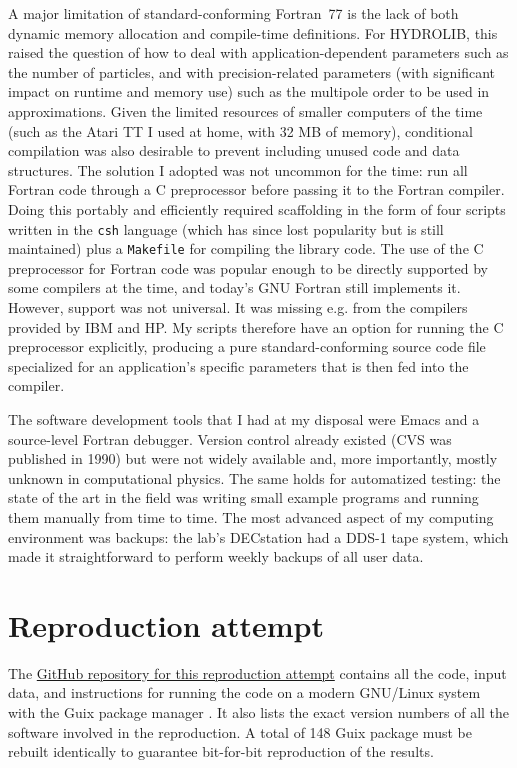 A major limitation of standard-conforming Fortran~77 is the lack of both dynamic memory allocation and compile-time definitions. For HYDROLIB, this raised the question of how to deal with application-dependent parameters such as the number of particles, and with precision-related parameters (with significant impact on runtime and memory use) such as the multipole order to be used in approximations. Given the limited resources of smaller computers of the time (such as the Atari TT I used at home, with 32 MB of memory), conditional compilation was also desirable to prevent including unused code and data structures. The solution I adopted was not uncommon for the time: run all Fortran code through a C preprocessor before passing it to the Fortran compiler. Doing this portably and efficiently required scaffolding in the form of four scripts written in the \texttt{csh} language (which has since lost popularity but is still maintained) plus a \texttt{Makefile} for compiling the library code. The use of the C preprocessor for Fortran code was popular enough to be directly supported by some compilers at the time, and today's GNU Fortran still implements it. However, support was not universal. It was missing e.g. from the compilers provided by IBM and HP. My scripts therefore have an option for running the C preprocessor explicitly, producing a pure standard-conforming source code file specialized for an application's specific parameters that is then fed into the compiler.

The software development tools that I had at my disposal were Emacs and a source-level Fortran debugger. Version control already existed (CVS was published in 1990) but were not widely available and, more importantly, mostly unknown in computational physics. The same holds for automatized testing: the state of the art in the field was writing small example programs and running them manually from time to time. The most advanced aspect of my computing environment was backups: the lab's DECstation had a DDS-1 tape system, which made it straightforward to perform weekly backups of all user data.

\section*{Reproduction attempt}

The \href{https://github.com/khinsen/rescience-ten-year-challenge-paper-4}{GitHub repository for this reproduction attempt} contains all the code, input data, and instructions for running the code on a modern GNU/Linux system with the Guix package manager \cite{CourtesReproducibleUserControlledSoftware2015,WurmusPiGxreproduciblegenomics2018}. It also lists the exact version numbers of all the software involved in the reproduction. A total of 148 Guix package must be rebuilt identically to guarantee bit-for-bit reproduction of the results.

